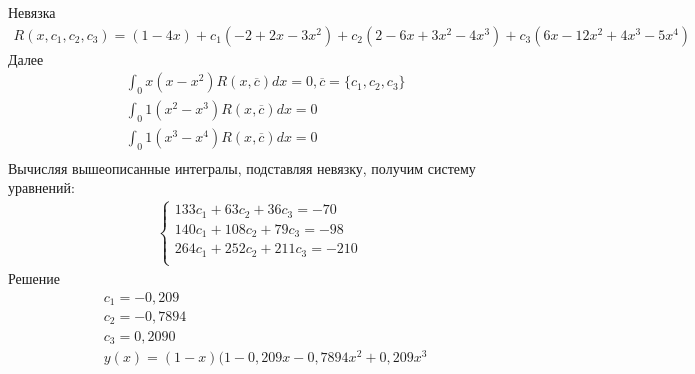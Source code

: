 \documentclass[12pt,a4paper]{article}
\begin{document}
	Невязка\\
	\begin{align*}
	R(x, c_1, c_2, c_3) = (1-4x) + c_1 (-2 + 2x - 3 x^2) + c_2 ( 2 - 6x + 3 x^2 - 4 x^3) + c_3 (6x - 12x^2 + 4x^3 - 5x^4)
	\end{align*}
	Далее\\
	\begin{align*}
	&\int_{0}{x} (x - x^2) R (x, \overline{c}) dx = 0, \overline{c} = \{c_1, c_2, c_3\}\\
	&\int_{0}{1} (x^2-x^3) R(x, \overline{c}) dx = 0\\
	&\int_{0}{1} (x^3-x^4) R(x, \overline{c}) dx = 0\\
	\end{align*}
	Вычисляя вышеописанные интегралы, подставляя невязку, получим систему уравнений:\\
	\begin{align*}
	\begin{cases}
	133c_1 + 63c_2 + 36c_3 = -70\\
	140c_1 + 108c_2 + 79c_3 = -98\\
	264c_1 + 252c_2 + 211c_3 = -210\\
	\end{cases}
	\end{align*}
	Решение\\
	\begin{align*}
	&c_1 = -0,209\\
	&c_2 = -0,7894\\
	&c_3 = 0,2090\\
	&y(x) =  (1-x)(1 -0,209x - 0,7894x^2 + 0,209x^3 \\
	\end{align*}
\end{document}
